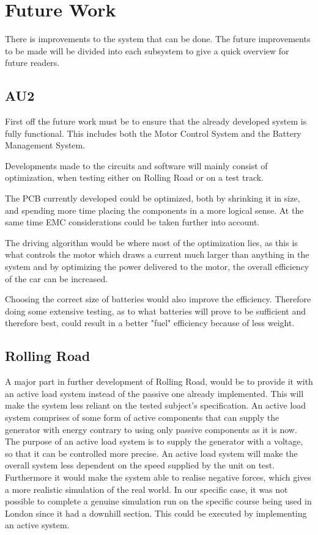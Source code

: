 \chapter {Future Work}
There is improvements to the system that can be done. The future improvements to be made will be divided into each subsystem to give a quick overview for future readers. 

\section{AU2}
First off the future work must be to ensure that the already developed system is fully functional. This includes both the Motor Control System and the Battery Management System.

Developments made to the circuits and software will mainly consist of optimization, when testing either on Rolling Road or on a test track. 

The PCB currently developed could be optimized, both by shrinking it in size, and spending more time placing the components in a more logical sense. At the same time EMC considerations could be taken further into account. 

The driving algorithm would be where most of the optimization lies, as this is what controls the motor which draws a current much larger than anything in the system and by optimizing the power delivered to the motor, the overall efficiency of the car can be increased. 

Choosing the correct size of batteries would also improve the efficiency. Therefore doing some extensive testing, as to what batteries will prove to be sufficient and therefore best, could result in a better "fuel" efficiency because of less weight.  

\section{Rolling Road}
A major part in further development of Rolling Road, would be to provide it with an active load system instead of the passive one already implemented. This will make the system less reliant on the tested subject's specification. An active load system comprises of some form of active components that can supply the generator with energy contrary to using only passive components as it is now. The purpose of an active load system is to supply the generator with a voltage, so that it can be controlled more precise. An active load system will make the overall system less dependent on the speed supplied by the unit on test. Furthermore it would make the system able to realise negative forces, which gives a more realistic simulation of the real world. In our specific case, it was not possible to complete a genuine simulation run on the specific course being used in London since it had a downhill section. This could be executed by implementing an active system. 

